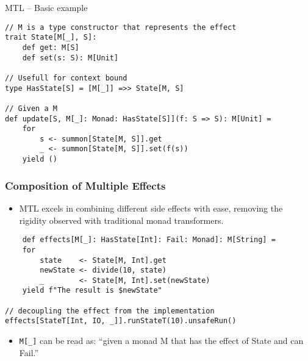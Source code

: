 \documentclass[presentation, 10pt]{beamer}\mode<presentation>{\usetheme{AMSBolognaFC}}
\begin{document}
\begin{frame}[fragile]{MTL -- Basic example}
\begin{tcolorbox}
\begin{verbatim}
// M is a type constructor that represents the effect
trait State[M[_], S]:
	def get: M[S]
	def set(s: S): M[Unit]

// Usefull for context bound
type HasState[S] = [M[_]] =>> State[M, S]

// Given a M 
def update[S, M[_]: Monad: HasState[S]](f: S => S): M[Unit] =
	for
		s <- summon[State[M, S]].get
		_ <- summon[State[M, S]].set(f(s))
	yield ()
\end{verbatim}
\end{tcolorbox}
\end{frame}
\begin{frame}[fragile]
	\frametitle{Composition of Multiple Effects}
	
	\begin{itemize}
		\item MTL excels in combining different side effects with ease, removing the rigidity observed with traditional monad transformers.
	\end{itemize}
\begin{tcolorbox}
	
\begin{verbatim}
	def effects[M[_]: HasState[Int]: Fail: Monad]: M[String] =
	for
		state    <- State[M, Int].get
		newState <- divide(10, state)
		_        <- State[M, Int].set(newState)
	yield f"The result is $newState"

// decoupling the effect from the implementation
effects[StateT[Int, IO, _]].runStateT(10).unsafeRun()
\end{verbatim}
\end{tcolorbox}

\begin{itemize}
	\item \texttt{M[_]} can be read as: ``given a monad M that has the effect of State and can Fail.''
\end{itemize}	
\end{frame}
\end{document}
